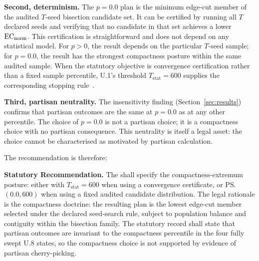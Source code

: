 \textbf{Second, determinism.}
The $p = 0.0$ plan is the minimum edge-cut member of the audited $T$-seed
bisection candidate set.
It can be certified by running all $T$ declared seeds and verifying that no
candidate in that set achieves a lower $\mathrm{EC}_{\mathrm{norm}}$.
This certification is straightforward and does not depend on any statistical
model.
For $p > 0$, the result depends on the particular $T$-seed sample; for
$p = 0.0$, the result has the strongest compactness posture within the same
audited sample.
When the statutory objective is convergence certification rather than a fixed
sample percentile, U.1's \cs{} threshold $T_{\mathrm{stat}}=600$ supplies the
corresponding stopping rule~\citep{b16paper}.

\textbf{Third, partisan neutrality.}
The insensitivity finding (Section~\ref{sec:results}) confirms that
partisan outcomes are the same at $p = 0.0$ as at any other percentile.
The choice of $p = 0.0$ is not a partisan choice; it is a compactness
choice with no partisan consequence.
This neutrality is itself a legal asset: the choice cannot be characterised
as motivated by partisan calculation.

The recommendation is therefore:
\begin{statute}
\textbf{Statutory Recommendation.}
The \dia{} shall specify the compactness-extremum posture: either
\cs{} with $T_{\mathrm{stat}} = 600$ when using a convergence certificate, or
\ps{}$(0.0, 600)$ when using a fixed audited candidate distribution.
The legal rationale is the compactness doctrine: the resulting plan is the
lowest edge-cut member selected under the declared seed-search rule, subject
to population balance and contiguity within the \ar{} bisection family.
The statutory record shall state that partisan outcomes are invariant to the
compactness percentile in the four fully swept U.8 states, so the compactness
choice is not supported by evidence of partisan cherry-picking.
\end{statute}
